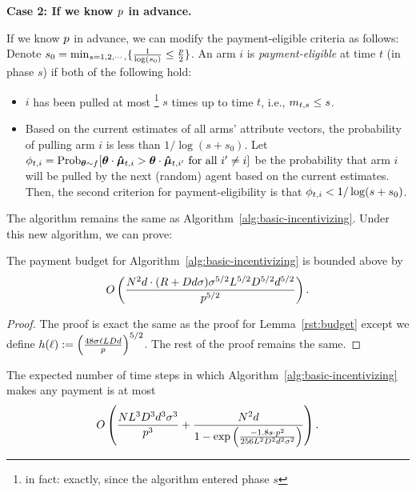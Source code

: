 \textbf{Case 2: If we know $p$ in advance.}

If we know $p$ in advance, we can modify the payment-eligible criteria as follows: Denote $s_0=\min_{s=1,2,\cdots,}\{\frac{1}{\log(s_0)}\leq \frac{p}{2}\}$. An arm $i$ is \emph{payment-eligible} at time $t$ (in phase $s$)
if both of the following hold:

\begin{itemize}
\item $i$ has been pulled at most%
\footnote{in fact: exactly, since the algorithm entered phase $s$}
$s$ times up to time $t$, i.e., $m_{t,s} \leq s$.
\item Based on the current estimates  of all arms'
attribute vectors, the probability of pulling arm $i$ is less than $1/\log(s+s_0)$. Let $\PullProb{t}{i} = \Prob[\AgV \sim \AgentDist]{\AgV \cdot \ArmEV{t}{i} > \AgV
  \cdot \ArmEV{t}{i'} \mbox{ for all } i' \neq i}$
be the probability that arm $i$ will be pulled
by the next (random) agent based on the current estimates. 
Then, the second criterion for payment-eligibility is that
$\phi_{t,i} < 1/\log(s+s_0)$.
\end{itemize}

The algorithm remains the same as Algorithm~\ref{alg:basic-incentivizing}. Under this new algorithm, we can prove:

\begin{theorem}
The payment budget for Algorithm~\ref{alg:basic-incentivizing} is bounded above by 
\begin{align*}
O \left(\frac{N^2 d \cdot (R + D d \sigma)\sigma^{5/2}L^{5/2}D^{5/2}d^{5/2}}{p^{5/2}} \right). 
\end{align*}
\end{theorem}

\begin{proof}
The proof is exact the same as the proof for Lemma~\ref{rst:budget} except we define $h(\ell) := 
\left( \frac{48 \sigma \ell L D d}{p} \right)^{5/2}$. The rest of the proof remains the same.
\end{proof}

\begin{lemma}  \label{lem:NumP2}
The expected number of time steps in which
Algorithm~\ref{alg:basic-incentivizing}
makes any payment is at most 
\begin{align}
O\left(\frac{N L^3 D^3 d^3 \sigma^3}{p^3}
  + \frac{N^2 d}{1 - \exp \left(
    \frac{-1.8 s \cdot p^2}{256 L^2 D^2 d^2 \sigma^2}
  \right)} \right). \nonumber 
\end{align}
\end{lemma}

